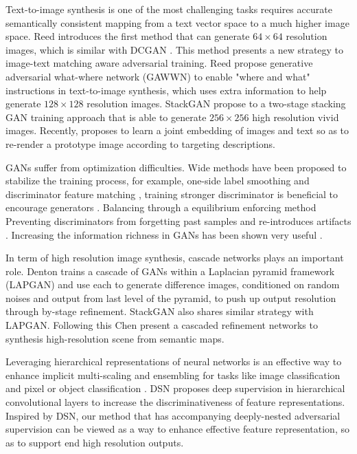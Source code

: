 \documentclass[10pt,twocolumn,letterpaper]{article}
\begin{document}
Text-to-image synthesis is one of the most challenging tasks requires accurate semantically consistent mapping from a text vector space to a much higher image space.  Reed \etal \cite{reed2016generative} introduces the first method that can generate $64{\times}64$ resolution images, which is similar with DCGAN \cite{}. This method presents a new strategy to image-text matching aware adversarial training. Reed \etal \cite{reed2016learning} propose  generative
adversarial what-where network (GAWWN) to enable "where and what" instructions in text-to-image synthesis, which uses extra information to help generate $128{\times}128$ resolution images. StackGAN \etal \cite{han2017stackgan} propose to a two-stage stacking GAN training approach that is able to generate $256{\times}256$ high resolution vivid images. Recently, \cite{dong2017semantic} proposes to learn a joint embedding of images and text so as to re-render a prototype image according to targeting descriptions. 	
	
GANs suffer from optimization difficulties. Wide methods have been proposed to stabilize the training process, for example, one-side label smoothing and discriminator feature matching \cite{salimans2016improved}, training stronger discriminator is beneficial to encourage generators \cite{arjovsky2017wasserstein}. Balancing through a equilibrium enforcing method \cite{berthelot2017began}
Preventing discriminators from forgetting past samples and re-introduces artifacts \cite{shrivastava2016learning}. Increasing the information richness in GANs has been shown very useful \cite{odena2016conditional}. 

In term of high resolution image synthesis, cascade networks plays an important role.
Denton \etal \cite{denton2015deep} trains a cascade of GANs within a Laplacian pyramid framework (LAPGAN) and use each to generate difference images, conditioned on random noises and output from last level of the pyramid, to push up output resolution through by-stage refinement. StackGAN also shares similar strategy with LAPGAN. Following this Chen \etal \cite{chen2017photographic} present a cascaded refinement networks to synthesis high-resolution scene from semantic maps.

Leveraging hierarchical representations of neural networks is an effective way to enhance implicit multi-scaling and ensembling for tasks like image classification \cite{lee2015deeply} and pixel or object classification \cite{xie2015holistically,cai2016unified}. DSN \cite{lee2015deeply} proposes deep supervision in hierarchical convolutional layers to increase the discriminativeness of feature representations. Inspired by DSN, our method that has accompanying deeply-nested adversarial supervision can be viewed as a way to enhance effective feature representation, so as to support end high resolution outputs.   
\end{document}

